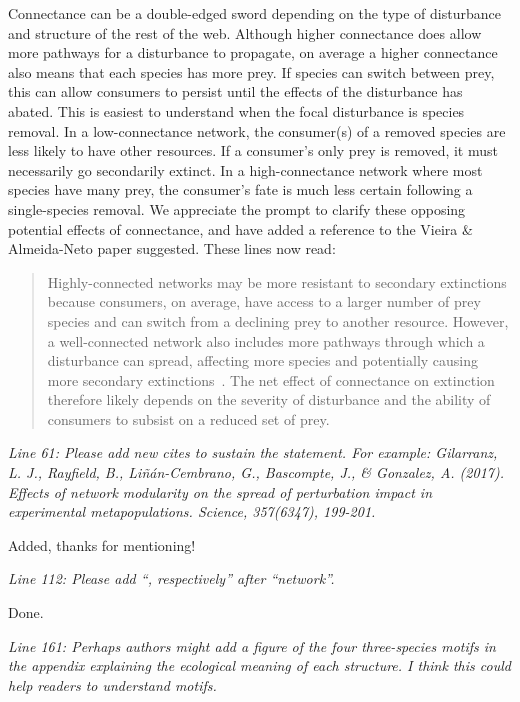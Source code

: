 \documentclass[12pt]{article}
\newcommand{\us}{\rm \setlength{\leftskip}{0.3cm} \setlength{\rightskip}{0.3cm}}
\newcommand{\them}{\it \setlength{\leftskip}{0cm} \setlength{\rightskip}{0cm}}
\begin{document}
        \us Connectance can be a double-edged sword depending on the type of disturbance and structure of the rest of the web. Although higher connectance does allow more pathways for a disturbance to propagate, on average a higher connectance also means that each species has more prey. If species can switch between prey, this can allow consumers to persist until the effects of the disturbance has abated. This is easiest to understand when the focal disturbance is species removal. In a low-connectance network, the consumer(s) of a removed species are less likely to have other resources. If a consumer's only prey is removed, it must necessarily go secondarily extinct. In a high-connectance network where most species have many prey, the consumer's fate is much less certain following a single-species removal. We appreciate the prompt to clarify these opposing potential effects of connectance, and have added a reference to the Vieira \& Almeida-Neto paper suggested. These lines now read:
        
            \begin{quotation}
                 Highly-connected networks may be more resistant to secondary extinctions \citep{Dunne2002, Eklof2006} because consumers, on average, have access to a larger number of prey species and can switch from a declining prey to another resource. However, a well-connected network also includes more pathways through which a disturbance can spread, affecting more species and potentially causing more secondary extinctions~\citep{Vieira2015}.
                    The net effect of connectance on extinction therefore likely depends on the severity of disturbance and the ability of consumers to subsist on a reduced set of prey.    
            \end{quotation}
        
        
        \them
        Line 61: Please add new cites to sustain the statement. For example:
        Gilarranz, L. J., Rayfield, B., Liñán-Cembrano, G., Bascompte, J., \& Gonzalez, A. (2017). Effects of network modularity on the spread of perturbation impact in experimental metapopulations. Science, 357(6347), 199-201.
        
        \us
        Added, thanks for mentioning!
        
        \them
        Line 112: Please add “, respectively” after “network”.
        
        \us
        Done.
        
        \them
        Line 161: Perhaps authors might add a figure of the four three-species motifs in the appendix explaining the ecological meaning of each structure. I think this could help readers to understand motifs.
        
\end{document}
